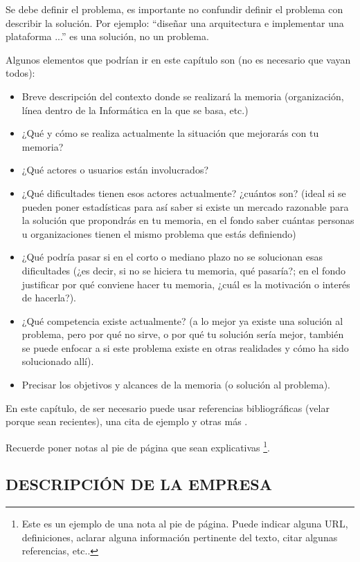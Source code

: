 
Se debe definir el problema, es importante no confundir definir el problema con describir la solución. Por ejemplo: ``diseñar una arquitectura e implementar una plataforma ...'' es una solución, no un problema.

Algunos elementos que podrían ir en este capítulo son (no es necesario que vayan todos):
\begin{itemize}
	\item Breve descripción del contexto donde se realizará la memoria (organización, línea dentro de la Informática en la que se basa, etc.)
	\item ¿Qué y cómo se realiza actualmente la situación que mejorarás con tu memoria?
	\item ¿Qué actores o usuarios están involucrados?
	\item ¿Qué dificultades tienen esos actores actualmente? ¿cuántos son? (ideal si se pueden poner estadísticas para así saber si existe un mercado razonable para la solución que propondrás en tu memoria, en el fondo saber cuántas personas u organizaciones tienen el mismo problema que estás definiendo)
	\item ¿Qué podría pasar si en el corto o mediano plazo no se solucionan esas dificultades (¿es decir, si no se hiciera tu memoria, qué pasaría?; en el fondo justificar por qué conviene hacer tu memoria, ¿cuál es la motivación o interés de hacerla?).
	\item ¿Qué competencia existe actualmente? (a lo mejor ya existe una solución al problema, pero por qué no sirve, o por qué tu solución sería mejor, también se puede enfocar a si este problema existe en otras realidades y cómo ha sido solucionado allí).
	\item Precisar los objetivos y alcances de la memoria (o solución al problema).
\end{itemize}

En este capítulo, de ser necesario puede usar referencias bibliográficas (velar porque sean recientes), una cita de ejemplo \cite{schwab2002cure} y otras más \cite{georget1994study,beaumont1990patient}.

Recuerde poner notas al pie de página que sean explicativas \footnote{Este es un ejemplo de una nota al pie de página. Puede indicar alguna URL, definiciones, aclarar alguna información pertinente del texto, citar algunas referencias, etc..}.

\subsection{DESCRIPCIÓN DE LA EMPRESA}

